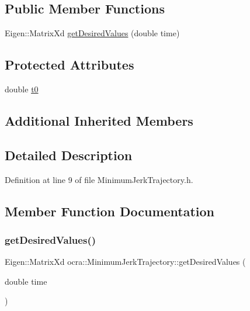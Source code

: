 \subsection*{Public Member Functions}
\begin{DoxyCompactItemize}
\item 
Eigen\+::\+Matrix\+Xd \hyperlink{classocra_1_1MinimumJerkTrajectory_aec9a296591707254657082d550bdb21f}{get\+Desired\+Values} (double time)
\end{DoxyCompactItemize}
\subsection*{Protected Attributes}
\begin{DoxyCompactItemize}
\item 
double \hyperlink{classocra_1_1MinimumJerkTrajectory_a59c485dca4c2f2ed0c95809561dfff46}{t0}
\end{DoxyCompactItemize}
\subsection*{Additional Inherited Members}


\subsection{Detailed Description}


Definition at line 9 of file Minimum\+Jerk\+Trajectory.\+h.



\subsection{Member Function Documentation}
\hypertarget{classocra_1_1MinimumJerkTrajectory_aec9a296591707254657082d550bdb21f}{}\label{classocra_1_1MinimumJerkTrajectory_aec9a296591707254657082d550bdb21f} 
\subsubsection{\texorpdfstring{get\+Desired\+Values()}{getDesiredValues()}}
{\footnotesize\ttfamily Eigen\+::\+Matrix\+Xd ocra\+::\+Minimum\+Jerk\+Trajectory\+::get\+Desired\+Values (\begin{DoxyParamCaption}\item[{double}]{time }\end{DoxyParamCaption})\hspace{0.3cm}{\ttfamily [virtual]}}

